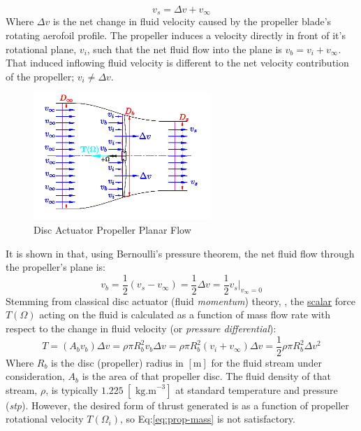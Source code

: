 \begin{equation}
v_s = \Delta v + v_\infty
\end{equation}
Where $\Delta v$ is the net change in fluid velocity caused by the propeller blade's rotating aerofoil profile. The propeller induces a velocity directly in front of it's rotational plane, $v_i$, such that the net fluid flow into the plane is $v_b=v_i+v_\infty$. That induced inflowing fluid velocity is different to the net velocity contribution of the propeller; $v_i\not=\Delta v$.
\par
\begin{figure}[htbp]
\centering
\includegraphics[width=0.6\textwidth]{figs/bem-flow}
\caption{Disc Actuator Propeller Planar Flow}
\label{fig:bem-flow}
\vspace{-15pt}
\end{figure}
It is shown in \cite{bladesforquadrotors} that, using Bernoulli's pressure theorem, the net fluid flow through the propeller's plane is:
\begin{equation}\label{eq:bernoulli}
v_b = \frac{1}{2} ( v_s - v_{\infty} ) = \frac{1}{2} \Delta v = \frac{1}{2} v_s \big|_{v_\infty=0}
\end{equation}
Stemming from classical disc actuator (fluid \emph{momentum}) theory, \cite{fluidmomentum}, the \underline{scalar} force $T(\Omega)$ acting on the fluid is calculated as a function of mass flow rate with respect to the change in fluid velocity (or \emph{pressure differential}):
\begin{equation}\label{eq:prop-mass}
T=(A_b v_b)\Delta v = \rho \pi R_b^2v_b \Delta v = \rho \pi R_b^2(v_i+v_\infty)\Delta v = \frac{1}{2} \rho \pi R_b^2 \Delta v^2
\end{equation}
Where $R_b$ is the disc (propeller) radius in $[\text{m}]$ for the fluid stream under consideration, $A_b$ is the area of that propeller disc. The fluid density of that stream, $\rho$, is typically $1.225~[\text{ kg.m}^{-3}]$ at standard temperature and pressure (\emph{stp}). However, the desired form of thrust generated is as a function of propeller rotational velocity $T(\Omega_i)$, so Eq:\ref{eq:prop-mass} is not satisfactory. 

